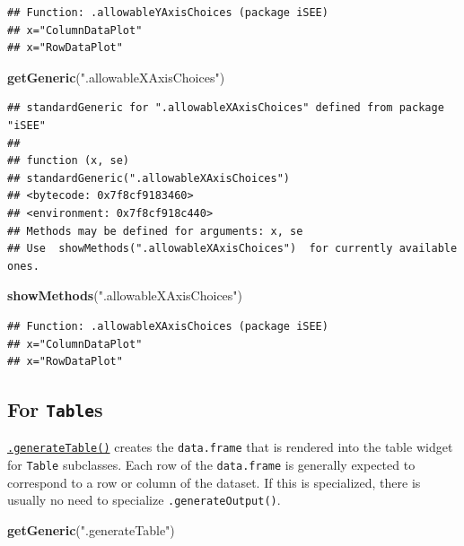 \documentclass[
]{book}
\newenvironment{Shaded}{\begin{snugshade}}{\end{snugshade}}
\newcommand{\KeywordTok}[1]{\textcolor[rgb]{0.13,0.29,0.53}{\textbf{#1}}}
\newcommand{\NormalTok}[1]{#1}
\newcommand{\StringTok}[1]{\textcolor[rgb]{0.31,0.60,0.02}{#1}}
\begin{document}
\begin{verbatim}
## Function: .allowableYAxisChoices (package iSEE)
## x="ColumnDataPlot"
## x="RowDataPlot"
\end{verbatim}

\begin{Shaded}
\begin{Highlighting}[]
\KeywordTok{getGeneric}\NormalTok{(}\StringTok{".allowableXAxisChoices"}\NormalTok{)}
\end{Highlighting}
\end{Shaded}

\begin{verbatim}
## standardGeneric for ".allowableXAxisChoices" defined from package "iSEE"
## 
## function (x, se) 
## standardGeneric(".allowableXAxisChoices")
## <bytecode: 0x7f8cf9183460>
## <environment: 0x7f8cf918c440>
## Methods may be defined for arguments: x, se
## Use  showMethods(".allowableXAxisChoices")  for currently available ones.
\end{verbatim}

\begin{Shaded}
\begin{Highlighting}[]
\KeywordTok{showMethods}\NormalTok{(}\StringTok{".allowableXAxisChoices"}\NormalTok{)}
\end{Highlighting}
\end{Shaded}

\begin{verbatim}
## Function: .allowableXAxisChoices (package iSEE)
## x="ColumnDataPlot"
## x="RowDataPlot"
\end{verbatim}

\hypertarget{for-tables}{%
\subsection{\texorpdfstring{For \texttt{Table}s}{For Tables}}\label{for-tables}}

\href{https://isee.github.io/iSEE/reference/table-generics.html}{\texttt{.generateTable()}} creates the \texttt{data.frame} that is rendered into the table widget for \texttt{Table} subclasses.
Each row of the \texttt{data.frame} is generally expected to correspond to a row or column of the dataset.
If this is specialized, there is usually no need to specialize \texttt{.generateOutput()}.

\begin{Shaded}
\begin{Highlighting}[]
\KeywordTok{getGeneric}\NormalTok{(}\StringTok{".generateTable"}\NormalTok{)}
\end{Highlighting}
\end{Shaded}
\end{document}
